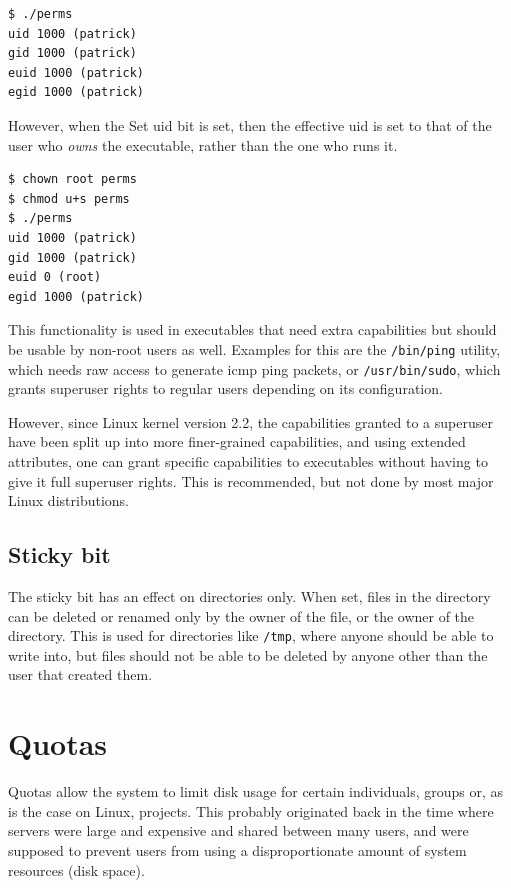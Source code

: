 \documentclass[a4paper]{article}
\begin{document}
\begin{verbatim}
$ ./perms
uid 1000 (patrick)
gid 1000 (patrick)
euid 1000 (patrick)
egid 1000 (patrick)  
\end{verbatim}
However, when the Set \gls{uid} bit is set, then the effective \gls{uid} is set to that of the user who \emph{owns} the executable, rather than the one who runs it.

\begin{verbatim}
$ chown root perms
$ chmod u+s perms
$ ./perms
uid 1000 (patrick)
gid 1000 (patrick)
euid 0 (root)
egid 1000 (patrick)  
\end{verbatim}
This functionality is used in executables that need extra capabilities but should be usable by non-root users as well. Examples for this are the \verb|/bin/ping| utility, which needs raw access to generate \gls{icmp} ping packets, or \verb|/usr/bin/sudo|, which grants superuser rights to regular users depending on its configuration.

However, since Linux kernel version 2.2, the capabilities granted to a superuser have been split up into more finer-grained capabilities, and using extended attributes, one can grant specific capabilities to executables without having to give it full superuser rights. This is recommended, but not done by most major Linux distributions.

\subsection{Sticky bit}

The sticky bit has an effect on directories only. When set, files in the directory can be deleted or renamed only by the owner of the file, or the owner of the directory. This is used for directories like \verb|/tmp|, where anyone should be able to write into, but files should not be able to be deleted by anyone other than the user that created them.

\section{Quotas}

Quotas allow the system to limit disk usage for certain individuals, groups or, as is the case on Linux, projects. This probably originated back in the time where servers were large and expensive and shared between many users, and were supposed to prevent users from using a disproportionate amount of system resources (disk space).
\end{document}
